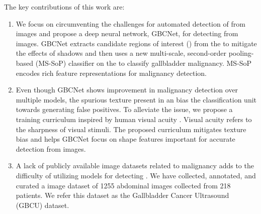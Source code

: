 %
The key contributions of this work are:
\begin{enumerate}%
	\item We focus on circumventing the challenges for automated detection of \gbc from \usg images and propose a deep neural network, GBCNet, for detecting \gbc from \usg images. GBCNet extracts candidate regions of interest (\rois) from the \usg to mitigate the effects of shadows and then uses a new  multi-scale, second-order pooling-based (MS-SoP) classifier on the \rois to classify gallbladder malignancy.
	MS-SoP encodes rich feature representations for malignancy detection. 
	\item Even though GBCNet shows improvement in \gb malignancy detection over multiple \sota models, the spurious texture present in an \roi bias the classification unit towards generating false positives. To alleviate the issue, we propose a training curriculum inspired by human visual acuity \cite{kwon2016compensation, vogelsang2018VisualAcuity}. Visual acuity refers to the sharpness of visual stimuli. %
	The proposed curriculum mitigates texture bias and helps GBCNet focus on shape features important for accurate \gbc detection from \usg images.%
	\item A lack of publicly available \usg image datasets related to \gb malignancy adds to the difficulty of utilizing \cnn models for detecting \gbc. We have collected, annotated, and curated a \usg image dataset of 1255 abdominal \usg images collected from 218 patients. We refer this dataset as the Gallbladder Cancer Ultrasound (GBCU) dataset.
\end{enumerate}
